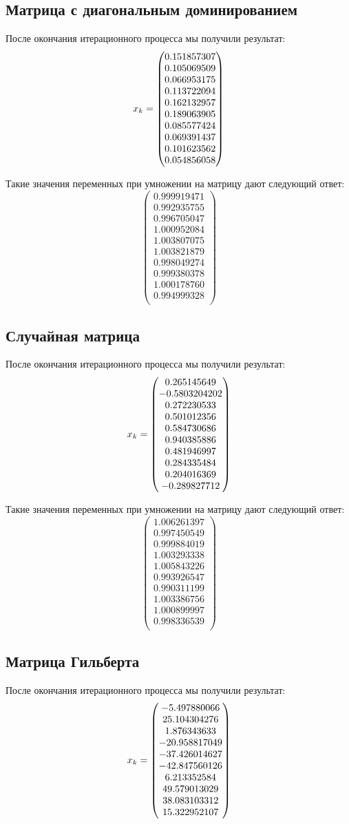\documentclass[../../report.tex]{subfiles}
\begin{document}
\subsection{Матрица с диагональным доминированием}
После окончания итерационного процесса мы получили результат:
\[
x_{k} = \begin{pmatrix} 0.151857307 \\ 0.105069509 \\ 0.066953175 \\ 0.113722094 \\ 0.162132957 \\ 0.189063905 \\ 0.085577424 \\ 0.069391437 \\ 0.101623562 \\ 0.054856058 \\ \end{pmatrix}
\]

Такие значения переменных при умножении на матрицу дают следующий ответ:
\[
\begin{pmatrix}
    0.999919471 \\
    0.992935755 \\
    0.996705047 \\
    1.000952084 \\
    1.003807075 \\
    1.003821879 \\
    0.998049274 \\
    0.999380378 \\
    1.000178760 \\
    0.994999328 \\
\end{pmatrix}
\]

\subsection{Случайная матрица}
После окончания итерационного процесса мы получили результат:
\[
x_{k} = \begin{pmatrix} 0.265145649 \\ -0.5803204202 \\ 0.272230533 \\ 0.501012356 \\ 0.584730686 \\ 0.940385886 \\ 0.481946997 \\ 0.284335484 \\ 0.204016369 \\ -0.289827712 \\ \end{pmatrix}
\]

Такие значения переменных при умножении на матрицу дают следующий ответ:
\[
\begin{pmatrix}
    1.006261397 \\
    0.997450549 \\
    0.999884019 \\
    1.003293338 \\
    1.005843226 \\
    0.993926547 \\
    0.990311199 \\
    1.003386756 \\
    1.000899997 \\
    0.998336539 \\
\end{pmatrix}
\]

\subsection{Матрица Гильберта}
После окончания итерационного процесса мы получили результат:
\[
x_{k} = \begin{pmatrix} -5.497880066 \\ 25.104304276 \\ 1.876343633 \\ -20.958817049 \\ -37.426014627 \\ -42.847560126 \\ 6.213352584 \\ 49.579013029 \\ 38.083103312 \\ 15.322952107 \\ \end{pmatrix}
\]
\end{document}
